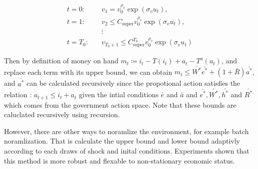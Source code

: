 \documentclass[11pt]{article}
\begin{document}
\begin{equation*}
  \begin{aligned}
    t = 0: \quad & v_{1} = v_{0}^{\rho_v} \exp\!\left(\sigma_v u_{t}\right), \\
    t = 1: \quad & v_{2} \leq C_{\text{super}}v_{0}^{\rho_v} \exp\!\left(\sigma_v u_{t}\right), \\
    & \vdots \\
    t = T_0: \quad & v_{T_0+1} \leq C_{\text{super}}^{T_0}v_{0}^{\rho_v} \exp\!\left(\sigma_v u_{t}\right)
  \end{aligned}
\end{equation*}

Then by definition of money on hand $m_t \coloneqq i_t - T(i_t) + a_t - T^{a}(a_t)$, and replace each term with its upper bound, 
we can obtain $m_t \leq \bar{W^*} \bar{e^*} + \left(1+\bar{R}\right) \bar{a^*}$, 
and $\bar{a^*}$ can be calculated recursively since the propotional action satisfies the relation : 
$a_{t+1} \leq i_t + a_t$ given the intial conditions $\bar{e}$ and $\bar{a}$ and $\bar{e^*}, \bar{W^*}, \bar{h^*}$ and $\bar{R^*}$ which comes from the government action space. Note that these bounds are caluclated recursively using recursion. 

However, there are other ways to noramlize the environment, for example batch noramlization. That is calculate the upper bound and lower bound adaptivly according to each draws of shock and inital conditions. Experiments shown that this method is more robust and flexable to non-stationary economic status.




\pagebreak

\printbibliography[title={REFERENCES }, heading=bibintoc]
\end{document}
